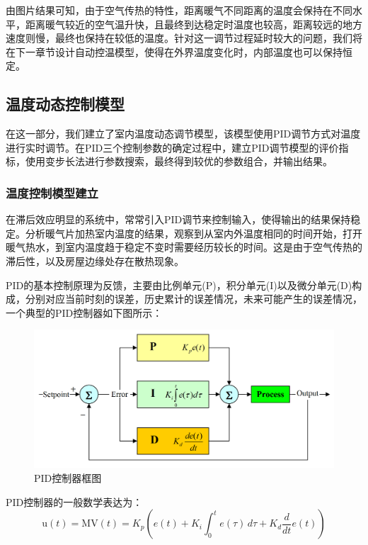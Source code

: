 \documentclass{my_paper}
\begin{document}
由图片结果可知，由于空气传热的特性，距离暖气不同距离的温度会保持在不同水平，距离暖气较近的空气温升快，且最终到达稳定时温度也较高，距离较远的地方速度则慢，最终也保持在较低的温度。针对这一调节过程延时较大的问题，我们将在下一章节设计自动控温模型，使得在外界温度变化时，内部温度也可以保持恒定。
\subsection{温度动态控制模型}
在这一部分，我们建立了室内温度动态调节模型，该模型使用PID调节方式对温度进行实时调节。在PID三个控制参数的确定过程中，建立PID调节模型的评价指标，使用变步长法进行参数搜索，最终得到较优的参数组合，并输出结果。
\subsubsection{温度控制模型建立}
在滞后效应明显的系统中，常常引入PID调节来控制输入，使得输出的结果保持稳定\cite{5}。分析暖气片加热室内温度的结果，观察到从室内外温度相同的时间开始，打开暖气热水，到室内温度趋于稳定不变时需要经历较长的时间。这是由于空气传热的滞后性，以及房屋边缘处存在散热现象。

PID\cite{6}的基本控制原理为反馈，主要由比例单元(P)，积分单元(I)以及微分单元(D)构成，分别对应当前时刻的误差，历史累计的误差情况，未来可能产生的误差情况，一个典型的PID控制器如下图所示：

\begin {figure}[h]
\centering %
\includegraphics[width=\textwidth]{pid.png}
\caption{PID控制器框图\cite{6}} %
\label{five}
\end {figure}

PID控制器的一般数学表达为：
\begin{equation}
    {\mathrm  {u}}(t)={\mathrm  {MV}}(t)=K_{p}({e(t)}+K_{{i}}\int _{{0}}^{{t}}{e(\tau )}\,{d\tau }+K_{{d}}{\frac  {d}{dt}}e(t))
\label{}
\end{equation}
\end{document}

